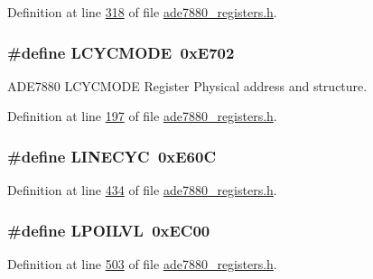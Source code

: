 Definition at line \hyperlink{a00036_source_l00318}{318} of file \hyperlink{a00036_source}{ade7880\-\_\-registers.\-h}.

\hypertarget{a00036_ad9e1efd6f7feec870444af831015a682}{
\subsubsection[{L\-C\-Y\-C\-M\-O\-D\-E}]{\setlength{\rightskip}{0pt plus 5cm}\#define L\-C\-Y\-C\-M\-O\-D\-E~0x\-E702}}\label{de/d8c/a00036_ad9e1efd6f7feec870444af831015a682}


A\-D\-E7880 L\-C\-Y\-C\-M\-O\-D\-E Register Physical address and structure. 



Definition at line \hyperlink{a00036_source_l00197}{197} of file \hyperlink{a00036_source}{ade7880\-\_\-registers.\-h}.

\hypertarget{a00036_a9d2caa865052cffb4b8850e55ee18c8d}{
\subsubsection[{L\-I\-N\-E\-C\-Y\-C}]{\setlength{\rightskip}{0pt plus 5cm}\#define L\-I\-N\-E\-C\-Y\-C~0x\-E60\-C}}\label{de/d8c/a00036_a9d2caa865052cffb4b8850e55ee18c8d}


Definition at line \hyperlink{a00036_source_l00434}{434} of file \hyperlink{a00036_source}{ade7880\-\_\-registers.\-h}.

\hypertarget{a00036_a7ad463156ea585050f4f3516081208c8}{
\subsubsection[{L\-P\-O\-I\-L\-V\-L}]{\setlength{\rightskip}{0pt plus 5cm}\#define L\-P\-O\-I\-L\-V\-L~0x\-E\-C00}}\label{de/d8c/a00036_a7ad463156ea585050f4f3516081208c8}


Definition at line \hyperlink{a00036_source_l00503}{503} of file \hyperlink{a00036_source}{ade7880\-\_\-registers.\-h}.

